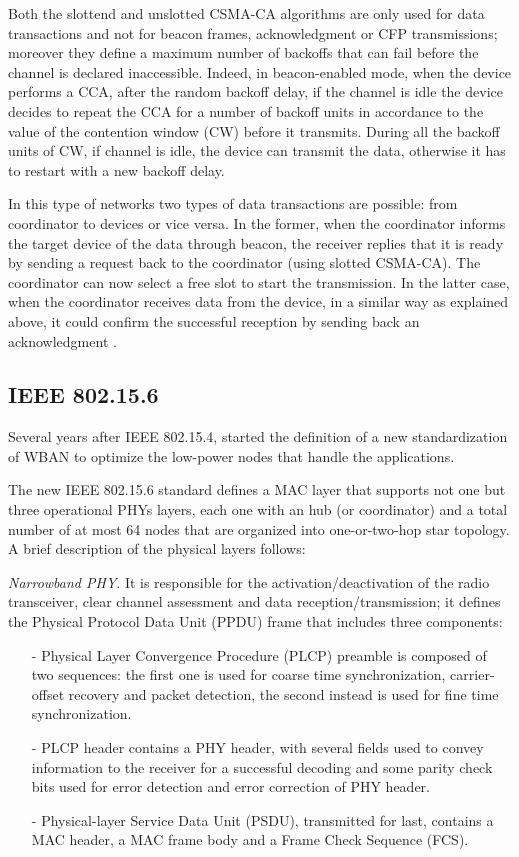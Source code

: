 \documentclass[conference]{IEEEtran}
\begin{document}
Both the slottend and unslotted CSMA-CA algorithms are only used for data transactions and not for beacon frames, acknowledgment or CFP transmissions; moreover they define a maximum number of backoffs that can fail before the channel is declared inaccessible. Indeed, in beacon-enabled mode, when the device performs a CCA, after the random backoff delay, if the channel is idle the device decides to repeat the CCA for a number of backoff units in accordance to the value of the contention window (CW) before it transmits. During all the backoff units of CW, if channel is idle, the device can transmit the data, otherwise it has to restart with a new backoff delay. 

In this type of networks two types of data transactions are possible: from coordinator to devices or vice versa. In the former, when the coordinator informs the target device of the data through beacon, the receiver replies that it is ready by sending a request back to the coordinator (using slotted CSMA-CA). The coordinator can now select a free slot to start the transmission. In the latter case, when the coordinator receives data from the device, in a similar way as explained above, it could confirm the successful reception by sending back an acknowledgment \cite{li2009performance}.


\subsection{IEEE 802.15.6}
Several years after IEEE 802.15.4, started the definition of a new standardization of WBAN to optimize the low-power nodes that handle the applications.

The new IEEE 802.15.6 standard defines a MAC layer that supports not one but three operational PHYs layers, each one with an hub (or coordinator) and a total number of at most 64 nodes that are organized into one-or-two-hop star topology. A brief description of the physical layers follows:
\newline

\textit{Narrowband PHY}. It is responsible for the activation/deactivation of the radio transceiver, clear channel assessment and data reception/transmission; it defines the Physical Protocol Data Unit (PPDU) frame that includes three components: 
\begin{itemize}
	\item[-] Physical Layer Convergence Procedure (PLCP) preamble is composed of two sequences: the first one is used for coarse time synchronization, carrier-offset recovery and packet detection, the second instead is used for fine time synchronization.
	\item[-] PLCP header contains a PHY header, with several fields used to convey information to the receiver for a successful decoding and some parity check bits used for error detection and error correction of PHY header.
	\item[-] Physical-layer Service Data Unit (PSDU), transmitted for last, contains a MAC header, a MAC frame body and a Frame Check Sequence (FCS).
\end{itemize}
\hfill
\end{document}
